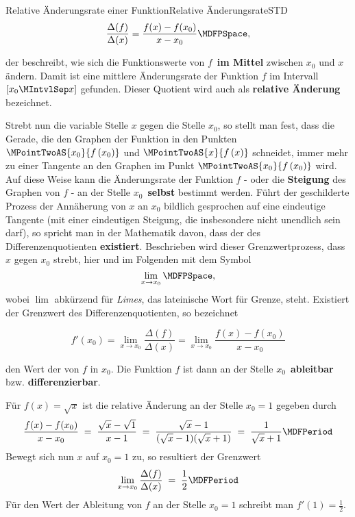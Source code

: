 \begin{MXContent}{Relative Änderungsrate einer Funktion}{Relative Änderungsrate}{STD}
\[
\frac{\Delta(f)}{\Delta(x)} = \frac{f(x) - f(x_0)}{x - x_0}\MDFPSpace,
\]

der beschreibt, wie sich die Funktionswerte von $f$\ \textbf{im Mittel} zwischen $x_0$ und $x$ ändern. %
Damit ist eine mittlere Änderungsrate der Funktion $f$ im Intervall $[x_0\MIntvlSep  x]$ gefunden. Dieser Quotient wird auch als \textbf{relative Änderung} bezeichnet.

Strebt nun die variable Stelle $x$ gegen die Stelle $x_0$, so stellt man fest, dass die Gerade, die den Graphen der Funktion
in den Punkten $\MPointTwoAS{x_0}{f\left(x_0\right)}$ und $\MPointTwoAS{x}{f\left(x\right)}$ schneidet, immer mehr zu einer Tangente
an den Graphen im Punkt $\MPointTwoAS{x_0}{f\left(x_0\right)}$ wird. Auf diese Weise kann die Änderungsrate
der Funktion $f$ - oder die \textbf{Steigung} des Graphen von $f$ - an der Stelle $x_0$\ \textbf{selbst} bestimmt werden. %
Führt der geschilderte Prozess der Annäherung von $x$ an $x_0$ bildlich gesprochen
auf eine eindeutige Tangente (mit einer eindeutigen Steigung, die insbesondere nicht unendlich sein darf), so spricht man in der Mathematik davon,
dass der  des Differenzenquotienten \textbf{existiert}. Beschrieben wird dieser Grenzwertprozess, dass $x$ gegen $x_0$ strebt,
hier und im Folgenden mit dem Symbol
\[
\lim_{x \rightarrow x_0} \MDFPSpace,
\]
wobei $\lim$ abkürzend für \emph{Limes}, das lateinische Wort für Grenze, steht.
Existiert der Grenzwert des Differenzenquotienten, so bezeichnet

\[
f'(x_0) = \lim_{x \rightarrow x_0} \frac{\Delta(f)}{\Delta(x)} 
 = \lim_{x \rightarrow x_0} \frac{f(x) - f(x_0)}{x - x_0} %
\] 

den Wert der  von $f$ in $x_0$. Die Funktion $f$ ist dann an der Stelle $x_0$\ \textbf{ableitbar} bzw. \textbf{differenzierbar}. %

\begin{MExample}
  Für $f(x)=\sqrt{x}$ ist die relative Änderung an der Stelle $x_0=1$ gegeben durch
  \[
    \frac{f(x) - f(x_0)}{x - x_0} \;=\;
    \frac{\sqrt{x}-\sqrt{1}}{x-1} \;=\; \frac{\sqrt{x}-1}{(\sqrt{x}-1)(\sqrt{x}+1)} \;=\; \frac1{\sqrt{x}+1} \MDFPeriod
  \]
  Bewegt sich nun $x$ auf $x_0=1$ zu, so resultiert der Grenzwert
  $$
  \lim_{x \rightarrow x_0} \frac{\Delta(f)}{\Delta(x)} \;=\; \frac12 \MDFPeriod
  $$
  Für den Wert der Ableitung von $f$ an der Stelle $x_0=1$ schreibt man $f'(1)=\frac12$.
\end{MExample}


\end{MXContent}
